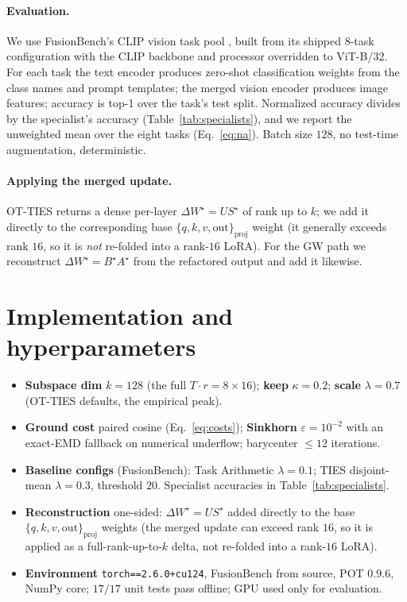 \documentclass[11pt]{article}
\newcommand{\dW}{\Delta W}
\newcommand{\otties}{\textsc{OT-TIES}}
\begin{document}
\paragraph{Evaluation.} We use FusionBench's CLIP vision task pool \citep{tang2024fusionbench}, built from
its shipped $8$-task configuration with the CLIP backbone and processor overridden to ViT-B/32. For each
task the text encoder produces zero-shot classification weights from the class names and prompt
templates; the merged vision encoder produces image features; accuracy is top-1 over the task's test
split. Normalized accuracy divides by the specialist's accuracy (Table~\ref{tab:specialists}), and we
report the unweighted mean over the eight tasks (Eq.~\eqref{eq:na}). Batch size $128$, no test-time
augmentation, deterministic.
\paragraph{Applying the merged update.} \otties{} returns a dense per-layer $\dW^\star=US^\star$ of rank up
to $k$; we add it directly to the corresponding base $\{q,k,v,\text{out}\}_{\text{proj}}$ weight (it
generally exceeds rank $16$, so it is \emph{not} re-folded into a rank-$16$ LoRA). For the GW path we
reconstruct $\dW^\star=B^\star A^\star$ from the refactored output and add it likewise.

\section{Implementation and hyperparameters}
\label{app:impl}
\begin{itemize}[leftmargin=1.4em,itemsep=2pt]
\item \textbf{Subspace dim} $k=128$ (the full $T\cdot r = 8\times16$); \textbf{keep} $\kappa=0.2$;
\textbf{scale} $\lambda=0.7$ (\otties{} defaults, the empirical peak).
\item \textbf{Ground cost} paired cosine (Eq.~\eqref{eq:costs}); \textbf{Sinkhorn} $\varepsilon=10^{-2}$
with an exact-EMD fallback on numerical underflow; barycenter $\le 12$ iterations.
\item \textbf{Baseline configs} (FusionBench): Task Arithmetic $\lambda=0.1$; TIES disjoint-mean
$\lambda=0.3$, threshold $20$. Specialist accuracies in Table~\ref{tab:specialists}.
\item \textbf{Reconstruction} one-sided: $\dW^\star = U S^\star$ added directly to the base
$\{q,k,v,\text{out}\}_{\text{proj}}$ weights (the merged update can exceed rank $16$, so it is applied as
a full-rank-up-to-$k$ delta, not re-folded into a rank-$16$ LoRA).
\item \textbf{Environment} \texttt{torch==2.6.0+cu124}, FusionBench from source, POT $0.9.6$, NumPy core;
$17/17$ unit tests pass offline; GPU used only for evaluation.
\end{itemize}
\end{document}
